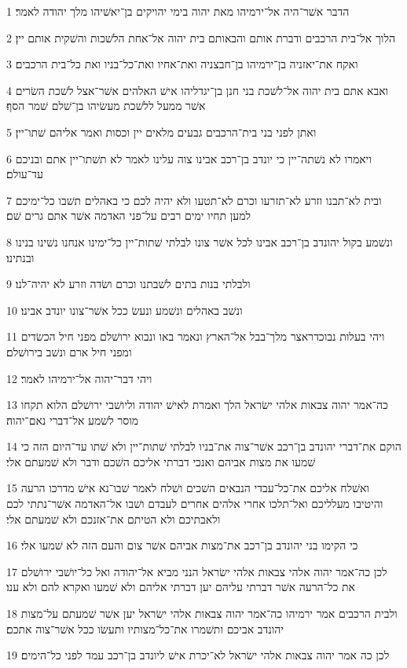 \par 1 הדבר אשׁר־היה אל־ירמיהו מאת יהוה בימי יהויקים בן־יאשׁיהו מלך יהודה לאמר׃
\par 2 הלוך אל־בית הרכבים ודברת אותם והבאותם בית יהוה אל־אחת הלשׁכות והשׁקית אותם יין׃
\par 3 ואקח את־יאזניה בן־ירמיהו בן־חבצניה ואת־אחיו ואת־כל־בניו ואת כל־בית הרכבים׃
\par 4 ואבא אתם בית יהוה אל־לשׁכת בני חנן בן־יגדליהו אישׁ האלהים אשׁר־אצל לשׁכת השׂרים אשׁר ממעל ללשׁכת מעשׂיהו בן־שׁלם שׁמר הסף׃
\par 5 ואתן לפני בני בית־הרכבים גבעים מלאים יין וכסות ואמר אליהם שׁתו־יין׃
\par 6 ויאמרו לא נשׁתה־יין כי יונדב בן־רכב אבינו צוה עלינו לאמר לא תשׁתו־יין אתם ובניכם עד־עולם׃
\par 7 ובית לא־תבנו וזרע לא־תזרעו וכרם לא־תטעו ולא יהיה לכם כי באהלים תשׁבו כל־ימיכם למען תחיו ימים רבים על־פני האדמה אשׁר אתם גרים שׁם׃
\par 8 ונשׁמע בקול יהונדב בן־רכב אבינו לכל אשׁר צונו לבלתי שׁתות־יין כל־ימינו אנחנו נשׁינו בנינו ובנתינו׃
\par 9 ולבלתי בנות בתים לשׁבתנו וכרם ושׂדה וזרע לא יהיה־לנו׃
\par 10 ונשׁב באהלים ונשׁמע ונעשׂ ככל אשׁר־צונו יונדב אבינו׃
\par 11 ויהי בעלות נבוכדראצר מלך־בבל אל־הארץ ונאמר באו ונבוא ירושׁלם מפני חיל הכשׂדים ומפני חיל ארם ונשׁב בירושׁלם׃
\par 12 ויהי דבר־יהוה אל־ירמיהו לאמר׃
\par 13 כה־אמר יהוה צבאות אלהי ישׂראל הלך ואמרת לאישׁ יהודה וליושׁבי ירושׁלם הלוא תקחו מוסר לשׁמע אל־דברי נאם־יהוה׃
\par 14 הוקם את־דברי יהונדב בן־רכב אשׁר־צוה את־בניו לבלתי שׁתות־יין ולא שׁתו עד־היום הזה כי שׁמעו את מצות אביהם ואנכי דברתי אליכם השׁכם ודבר ולא שׁמעתם אלי׃
\par 15 ואשׁלח אליכם את־כל־עבדי הנבאים השׁכים ושׁלח לאמר שׁבו־נא אישׁ מדרכו הרעה והיטיבו מעלליכם ואל־תלכו אחרי אלהים אחרים לעבדם ושׁבו אל־האדמה אשׁר־נתתי לכם ולאבתיכם ולא הטיתם את־אזנכם ולא שׁמעתם אלי׃
\par 16 כי הקימו בני יהונדב בן־רכב את־מצות אביהם אשׁר צום והעם הזה לא שׁמעו אלי׃
\par 17 לכן כה־אמר יהוה אלהי צבאות אלהי ישׂראל הנני מביא אל־יהודה ואל כל־יושׁבי ירושׁלם את כל־הרעה אשׁר דברתי עליהם יען דברתי אליהם ולא שׁמעו ואקרא להם ולא ענו׃
\par 18 ולבית הרכבים אמר ירמיהו כה־אמר יהוה צבאות אלהי ישׂראל יען אשׁר שׁמעתם על־מצות יהונדב אביכם ותשׁמרו את־כל־מצותיו ותעשׂו ככל אשׁר־צוה אתכם׃
\par 19 לכן כה אמר יהוה צבאות אלהי ישׂראל לא־יכרת אישׁ ליונדב בן־רכב עמד לפני כל־הימים׃

